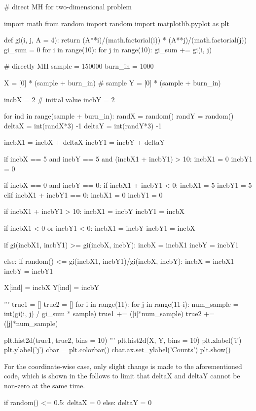 \begin{python}
# direct MH for two-dimensional problem

import math
from random import random
import matplotlib.pyplot as plt

def gi(i, j, A = 4):
    return (A**i)/(math.factorial(i)) * (A**j)/(math.factorial(j))
gi_sum = 0
for i in range(10):
    for j in range(10):
        gi_sum += gi(i, j)


# directly MH
sample = 150000
burn_in = 1000

X = [0] * (sample + burn_in)  # sample
Y = [0] * (sample + burn_in)

incbX = 2  # initial value
incbY = 2

for ind in range(sample + burn_in):
    randX = random()
    randY = random()
    deltaX = int(randX*3) -1
    deltaY = int(randY*3) -1
    
    incbX1 = incbX + deltaX
    incbY1 = incbY + deltaY
    
    if incbX == 5 and incbY == 5 and (incbX1 + incbY1) > 10:
        incbX1 = 0
        incbY1 = 0
    
    if incbX == 0 and incbY == 0:
        if incbX1 + incbY1 < 0:
            incbX1 = 5
            incbY1 = 5
        elif incbX1 + incbY1 == 0:
            incbX1 = 0
            incbY1 = 0
    
    if incbX1 + incbY1 > 10:
        incbX1 = incbY
        incbY1 = incbX

    if incbX1 < 0 or incbY1 < 0:
        incbX1 = incbY
        incbY1 = incbX
        
    if gi(incbX1, incbY1) >= gi(incbX, incbY):
        incbX = incbX1
        incbY = incbY1
    
    else:
        if random() <= gi(incbX1, incbY1)/gi(incbX, incbY):
            incbX = incbX1
            incbY = incbY1
    
    X[ind] = incbX
    Y[ind] = incbY

'''
true1 = []
true2 = []
for i in range(11):
    for j in range(11-i):
        num_sample = int(gi(i, j) / gi_sum * sample)
        true1 += ([i]*num_sample)
        true2 += ([j]*num_sample)
        
plt.hist2d(true1, true2, bins = 10)
'''
plt.hist2d(X, Y, bins = 10)
plt.xlabel('i')
plt.ylabel('j')
cbar = plt.colorbar()
cbar.ax.set_ylabel('Counts')
plt.show()
\end{python}

For the coordinate-wise case, only slight change is made to the aforementioned code, which is shown in the follows to limit that deltaX and deltaY cannot be non-zero at the same time.
\begin{python}
    if random() <= 0.5:
        deltaX = 0
    else:
        deltaY = 0
\end{python}

